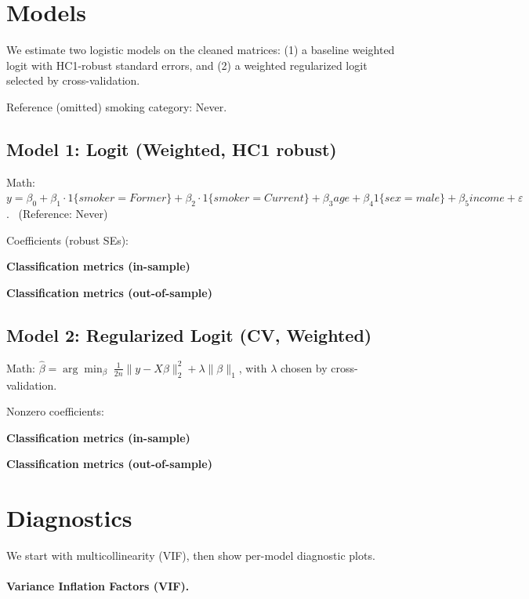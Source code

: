 \documentclass{article}
\begin{document}
\section{Models}
We estimate two logistic models on the cleaned matrices: (1) a baseline weighted logit with HC1-robust standard errors, and (2) a weighted regularized logit selected by cross-validation.
\par\noindent Reference (omitted) smoking category: Never.
\subsection*{Model 1: Logit (Weighted, HC1 robust)}
\noindent Math: $\displaystyle y = \beta_0 + \beta_1 \cdot 1\{smoker=Former\} + \beta_2 \cdot 1\{smoker=Current\} + \beta_3 age + \beta_4 1\{sex=male\} + \beta_5 income + \varepsilon$. \ (Reference: Never)
\par\noindent Coefficients (robust SEs):

\medskip
\noindent \textbf{Classification metrics (in-sample)}
\par

\medskip
\noindent \textbf{Classification metrics (out-of-sample)}
\par

\medskip
\subsection*{Model 2: Regularized Logit (CV, Weighted)}
\noindent Math: $\displaystyle \hat{\beta} = \arg\min_{\beta} \; \frac{1}{2n} \lVert y - X\beta \rVert_2^2 + \lambda \lVert \beta \rVert_1$, with $\lambda$ chosen by cross-validation.
\par\noindent Nonzero coefficients:

\medskip
\noindent \textbf{Classification metrics (in-sample)}
\par

\medskip
\noindent \textbf{Classification metrics (out-of-sample)}
\par

\medskip
\section{Diagnostics}
We start with multicollinearity (VIF), then show per-model diagnostic plots.
\paragraph{Variance Inflation Factors (VIF).} 

\end{document}
